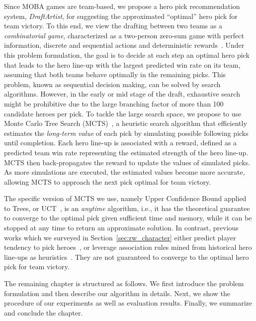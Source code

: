 Since MOBA games are team-based, we propose a hero pick recommendation system, \textit{DraftArtist}, for suggesting the approximated ``optimal'' hero pick for team victory. To this end, we view the drafting between two teams as a \textit{combinatorial game}, characterized as a two-person zero-sum game with perfect information, discrete and sequential actions and deterministic rewards~\citep{browne2012survey}. Under this problem formulation, the goal is to decide at each step an optimal hero pick that leads to the hero line-up with the largest predicted win rate on its team, assuming that both teams behave optimally in the remaining picks. This problem, known as sequential decision making, can be solved by search algorithms. However, in the early or mid stage of the draft, exhaustive search might be prohibitive due to the large branching factor of more than 100 candidate heroes per pick. To tackle the large search space, we propose to use Monte Carlo Tree Search (MCTS)~\citep{coulom2006efficient}, a heuristic search algorithm that efficiently estimates the \textit{long-term value} of each pick by simulating possible following picks until completion. Each hero line-up is associated with a reward, defined as a predicted team win rate representing the estimated strength of the hero line-up. MCTS then back-propagates the reward to update the values of simulated picks. As more simulations are executed, the estimated values become more accurate, allowing MCTS to approach the next pick optimal for team victory. 

The specific version of MCTS we use, namely Upper Confidence Bound applied to Trees, or UCT~\citep{kocsis2006bandit}, is an \textit{anytime} algorithm, i.e., it has the theoretical guarantee to converge to the optimal pick given sufficient time and memory, while it can be stopped at any time to return an approximate solution. In contrast, previous works which we surveyed in Section~\ref{sec:rw_character} either predict player tendency to pick heroes~\citep{summerville2017reco}, or leverage association rules mined from historical hero line-ups as heuristics~\citep{hanke2017reco}. They are not guaranteed to converge to the optimal hero pick for team victory.

The remaining chapter is structured as follows. We first introduce the problem formulation and then describe our algorithm in details. Next, we show the procedure of our experiments as well as evaluation results. Finally, we summarize and conclude the chapter.

